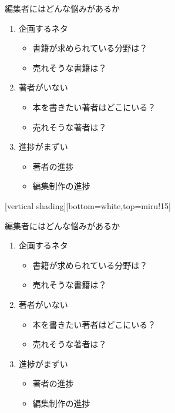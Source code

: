 \documentclass[14pt,dvipdfmx,uplatex]{beamer}
\begin{document}
\begin{frame}[t]{\inhibitglue 編集者にはどんな悩みがあるか}
  \sffamily
    \begin{enumerate}
      \item 企画するネタ
        \begin{itemize}
          \item 書籍が求められている分野は？
          \item 売れそうな書籍は？\\[3ex]
        \end{itemize} 
      \item 著者がいない
        \begin{itemize}
          \item 本を書きたい著者はどこにいる？
          \item 売れそうな著者は？\\[3ex]
        \end{itemize} 
      \item 進捗がまずい
        \begin{itemize}
          \item 著者の進捗
          \item 編集制作の進捗
        \end{itemize}
    \end{enumerate}
\end{frame}

[vertical shading][bottom=white,top=miru!15]

\begin{frame}[t]{\inhibitglue 編集者にはどんな悩みがあるか}
  \sffamily
    \begin{enumerate}
      \item 企画するネタ
        \begin{itemize}
          \item 書籍が求められている分野は？
          \item 売れそうな書籍は？\\[3ex]
        \end{itemize} 
      \item<gray@1-> {\color{10gray} 著者がいない}
        \begin{itemize}
          \item {\color{10gray} 本を書きたい著者はどこにいる？}
          \item {\color{10gray} 売れそうな著者は？\\[3ex]}
        \end{itemize} 
      \item<gray@1-> {\color{10gray} 進捗がまずい}
        \begin{itemize}
          \item {\color{10gray} 著者の進捗}
          \item {\color{10gray} 編集制作の進捗}
        \end{itemize}
    \end{enumerate}
\end{frame}
\end{document}
